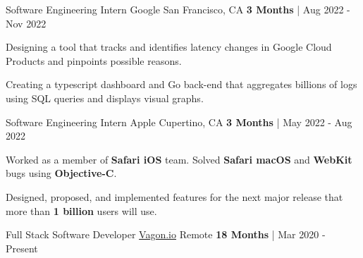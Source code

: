 
\begin{cventries}
\vspace{-1mm}
  \cvexpentry
   {Software Engineering Intern} %
    {Google} %
    {San Francisco, CA} %
    {\textbf{3 Months} | Aug 2022 - Nov 2022} %
    {
      \begin{cvitems} %
        \item {Designing a tool that tracks and identifies latency changes in Google Cloud Products and pinpoints possible reasons.}
        \item {Creating a typescript dashboard and Go back-end that aggregates billions of logs using SQL queries and displays visual graphs.}
      \end{cvitems}
    }
  \cvexpentry
   {Software Engineering Intern} %
    {Apple} %
    {Cupertino, CA} %
    {\textbf{3 Months} | May 2022 - Aug 2022} %
    {
      \begin{cvitems} %
        \item {Worked as a member of \textbf{Safari iOS} team. Solved \textbf{Safari macOS} and \textbf{WebKit} bugs using \textbf{Objective-C}. }
        \item {Designed, proposed, and implemented features for the next major release that more than \textbf{1 billion} users will use.}
      \end{cvitems}
    }
  \cvexpentry
   {Full Stack Software Developer} %
    {\href{https://vagon.io}{Vagon.io}} %
    {Remote} %
    {\textbf{18 Months} | Mar 2020 - Present} %
    {
      \begin{cvitems} %

\end{cvitems}}
\end{cventries}
